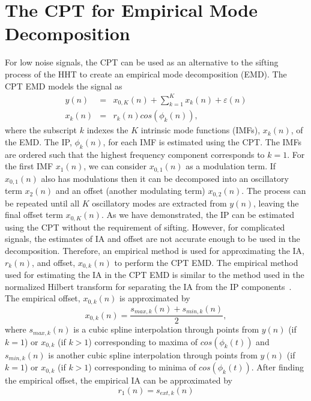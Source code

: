 \documentclass[journal,11pt,a4paper,onecolumn,draftcls]{IEEEtran}
\begin{document}
\section{The CPT for Empirical Mode Decomposition}\label{sect:CPTEMDSection}
For low noise signals, the CPT can be used as an alternative to the sifting process of the HHT to create an empirical mode decomposition (EMD). The CPT EMD models the signal as
\begin{eqnarray}
    y(n) &=& x_{0,K}(n) + \sum_{k=1}^{K}x_k(n) + \varepsilon(n) \\
    x_k\left(n\right) &=& r_k\left(n\right)cos\left(\phi_k\left(n\right)\right),
\end{eqnarray}
where the subscript $k$ indexes the $K$ intrinsic mode functions (IMFs), $x_k(n)$, of the EMD. The IP, $\phi_k(n)$, for each IMF is estimated using the CPT. The IMFs are ordered such that the highest frequency component corresponds to $k=1$. For the first IMF $x_1(n)$, we can consider $x_{0,1}(n)$ as a modulation term. If $x_{0,1}(n)$ also has modulations then it can be decomposed into an oscillatory term $x_2(n)$ and an offset (another modulating term) $x_{0,2}(n)$. The process can be repeated until all $K$ oscillatory modes are extracted from $y(n)$, leaving the final offset term $x_{0,K}(n)$.
As we have demonstrated, the IP can be estimated using the CPT without the requirement of sifting. However, for complicated signals, the estimates of IA and offset are not accurate enough to be used in the decomposition. Therefore, an empirical method is used for approximating the IA, $r_k(n)$, and offset, $x_{0,k}(n)$ to perform the CPT EMD. The empirical method used for estimating the IA in the CPT EMD is similar to the method used in the normalized Hilbert transform for separating the IA from the IP components~\cite{Huang2005}. The empirical offset, $x_{0,k}(n)$ is approximated by
\begin{equation}
    x_{0,k}(n) = \frac{s_{max,k}(n) + s_{min,k}(n)}{2},
\end{equation}
where $s_{max,k}(n)$ is a cubic spline interpolation through points from $y(n)$ (if $k=1$) or $x_{0,k}$ (if $k>1$) corresponding to maxima of $cos(\phi_k(t))$ and $s_{min,k}(n)$ is another cubic spline interpolation through points from $y(n)$ (if $k=1$) or $x_{0,k}$ (if $k>1$) corresponding to minima of $cos(\phi_k(t))$. After finding the empirical offset, the empirical IA can be approximated by 
\begin{equation}
    r_1(n) = s_{ext,k}(n)
\end{equation}
\end{document}
